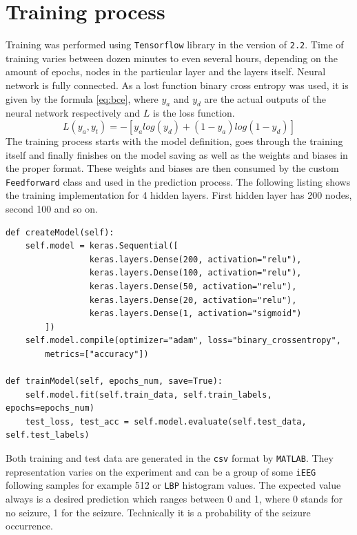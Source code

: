 \section{Training process}
Training was performed using \verb|Tensorflow| library in the version of \verb|2.2|. Time of training varies between dozen minutes to even several hours, depending on the amount of epochs, nodes in the particular layer and the layers itself. Neural network is fully connected. As a lost function binary cross entropy was used, it is given by the formula \ref{eq:bce}, where $y_a$ and $y_d$ are the actual outputs of the neural network respectively and $L$ is the loss function.
\begin{equation} \label{eq:bce}
L(y_a,y_t)=-[y_alog(y_d)+(1-y_a)log(1-y_d)]
\end{equation}
The training process starts with the model definition, goes through the training itself and finally finishes on the model saving as well as the weights and biases in the proper format. These weights and biases are then consumed by the custom \verb|Feedforward| class and used in the prediction process. The following listing shows the training implementation for 4 hidden layers. First hidden layer has 200 nodes, second 100 and so on.
\begin{verbatim}
def createModel(self):
    self.model = keras.Sequential([
                 keras.layers.Dense(200, activation="relu"),
                 keras.layers.Dense(100, activation="relu"), 
                 keras.layers.Dense(50, activation="relu"),
                 keras.layers.Dense(20, activation="relu"),
                 keras.layers.Dense(1, activation="sigmoid")
        ])
    self.model.compile(optimizer="adam", loss="binary_crossentropy", 
        metrics=["accuracy"])

def trainModel(self, epochs_num, save=True):
    self.model.fit(self.train_data, self.train_labels, epochs=epochs_num)
    test_loss, test_acc = self.model.evaluate(self.test_data, self.test_labels)
\end{verbatim}
Both training and test data are generated in the \verb|csv| format by \verb|MATLAB|. They representation varies on the experiment and can be a group of some \verb|iEEG| following samples for example 512 or \verb|LBP| histogram values. The expected value always is a desired prediction which ranges between 0 and 1, where 0 stands for no seizure, 1 for the seizure. Technically it is a probability of the seizure occurrence.

\begingroup
\renewcommand{\cleardoublepage}{}
\renewcommand{\clearpage}{}
